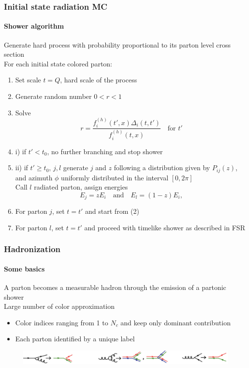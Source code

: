 \documentclass[aspectratio=43]{beamer}
\begin{document}
\begin{frame}

	\frametitle{Initial state radiation MC}
	\framesubtitle{Shower algorithm}
	
	\footnotesize Generate hard process with probability proportional to its parton level cross section \\
	\footnotesize For each initial state colored parton:
	\begin{enumerate}
		\item Set scale $t = Q$, hard scale of the process
		\item Generate random number $0 < r < 1$
		\item Solve $$r = \frac{f^{(h)}_{i}(t', x) \Delta_{i}(t, t')}{f^{(h)}_{i}(t, x)} \quad \textrm{for }t'$$
		\item \footnotesize i) if $t' < t_{0}$, no further branching and stop shower
		\item \footnotesize ii) if $t' \geq t_{0}$, $j, l$ generate $j$ and $z$ following a distribution given by  $P_{ij}(z)$, and  azimuth $\phi$ uniformly distributed in the interval $[0, 2\pi]$ \\
		Call $l$ radiated parton, assign energies $$E_{j} = zE_{i} \quad \textrm{and}\quad E_{l} = (1 - z)E_{i}, $$
		\item \footnotesize For parton $j$, set $t = t'$ and start from (2)
		\item \footnotesize For parton $l$, set $t = t'$ and proceed with timelike shower as described in FSR
	\end{enumerate}
\end{frame}

\begin{frame}
	
	\frametitle{Hadronization}
	\framesubtitle{Some basics}

	\footnotesize A parton becomes a measurable hadron through the emission of a partonic shower \\
	\footnotesize Large number of color approximation 
	\begin{itemize}
		\item \footnotesize Color indices ranging from 1 to $N_{c}$ and keep only dominant contribution
		\item \footnotesize Each parton identified by a unique label
	\end{itemize}

	\begin{figure}
		\includegraphics[width = 8.5 cm]{plots/hadronization.png}
	\end{figure}

\end{frame}
\end{document}
